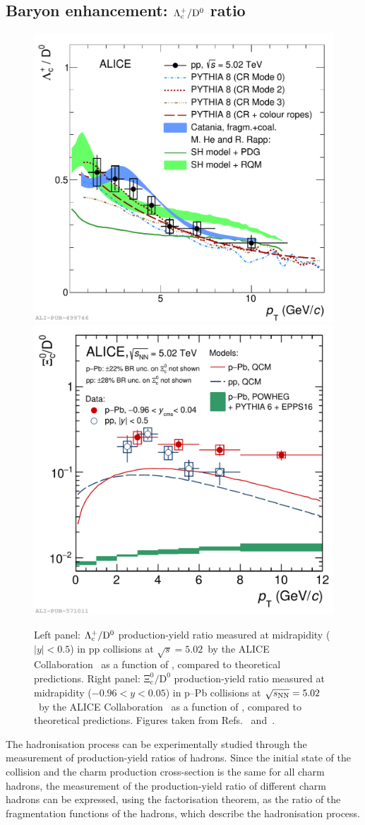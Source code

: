 \subsection{Baryon enhancement: \texorpdfstring{$\mathrm{\mathrm{\Lambda_c^+}/D^0}$}{Lc/D0} ratio}
\begin{figure}[htb]
    \centering
    \includegraphics[width=0.48\linewidth]{Figures/Chapter 2/LcD_models_withModifiedModels_ropes_coal_2.pdf}
    \includegraphics[width=0.48\linewidth]{Figures/Chapter 2/Xic0_D0_Ratio.pdf}
    \caption{Left panel: $\mathrm{\mathrm{\Lambda_c^+}/D^0}$ production-yield ratio measured at midrapidity ($\lvert y\rvert < 0.5$) in pp collisions at $\sqrt{s} = 5.02$~\tev by the ALICE Collaboration~\cite{ALICE:2020wla} as a function of \pt, compared to theoretical predictions. Right panel: $\mathrm{\Xi_c^0/D^0}$ production-yield ratio measured at midrapidity ($-0.96 < y < 0.05$) in p--Pb collisions at $\sqrt{s_\mathrm{NN}} = 5.02$~\tev by the ALICE Collaboration~\cite{ALICE:2020wla} as a function of \pt, compared to theoretical predictions. Figures taken from Refs.~\cite{ALICE:2020wla} and~\cite{ALICE:2024ozd}.}
    \label{fig:Lambda_c_D0}
\end{figure}
The hadronisation process can be experimentally studied through the measurement of production-yield ratios of hadrons. Since the initial state of the collision and the charm production cross-section is the same for all charm hadrons, the measurement of the production-yield ratio of different charm hadrons can be expressed, using the factorisation theorem, as the ratio of the fragmentation functions of the hadrons, which describe the hadronisation process. 

